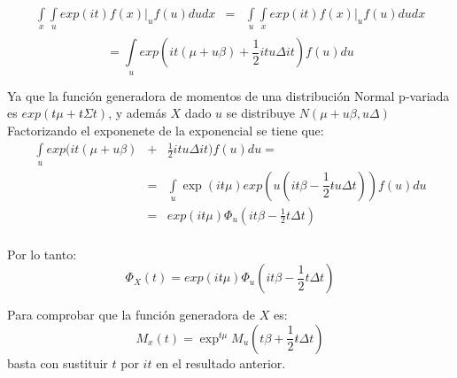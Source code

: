 \begin{eqnarray}
\underset{x}{\int}\underset{u}{\int}exp(it)f(x)|_{u}f(u)dudx&=&\underset{u}{\int}\underset{x}{\int}exp(it)f(x)|_{u}f(u)dudx \nonumber \\
\end{eqnarray}
\begin{equation*}
=\underset{u}{\int}exp(it(\mu+ u\beta)+\frac{1}{2}itu\Delta it)f(u)du
\end{equation*}


Ya que la función generadora de momentos de una distribución Normal p-variada es $exp(t\acute{}\mu + t\acute{}\Sigma t)$, y además $X$ dado $u$ se distribuye $N(\mu + u\beta, u\Delta)$ \\

Factorizando el exponenete de la exponencial se tiene que:\\
\begin{eqnarray}
\underset{u}{\int}exp(it(\mu+ u\beta)&+&\frac{1}{2}itu\Delta it)f(u)du=\nonumber\\
&=&\underset{u}{\int}\exp(it\acute{}\mu)exp(u(it\acute{}\beta -\dfrac{1}{2}t\acute{}u \Delta t))f(u)du\nonumber\\
&=&exp(it\acute{}\mu)\Phi_{u}(it\beta-\frac{1}{2}t\Delta t)\nonumber\\
\end{eqnarray}

Por lo tanto: 
\begin{equation*}
\Phi_{X}(t) = exp(it\acute{}\mu)\Phi_{u}(it\beta-\frac{1}{2}t\Delta t)
\end{equation*}

Para comprobar que la función generadora de $X$ es:
\begin{equation*}
M_{x}(t)=\exp^{t\acute{}\mu}M_{u}(t\beta+\dfrac{1}{2}t\acute{}\Delta t)
\end{equation*}
basta con sustituir $t$ por $it$ en el resultado anterior.\\

